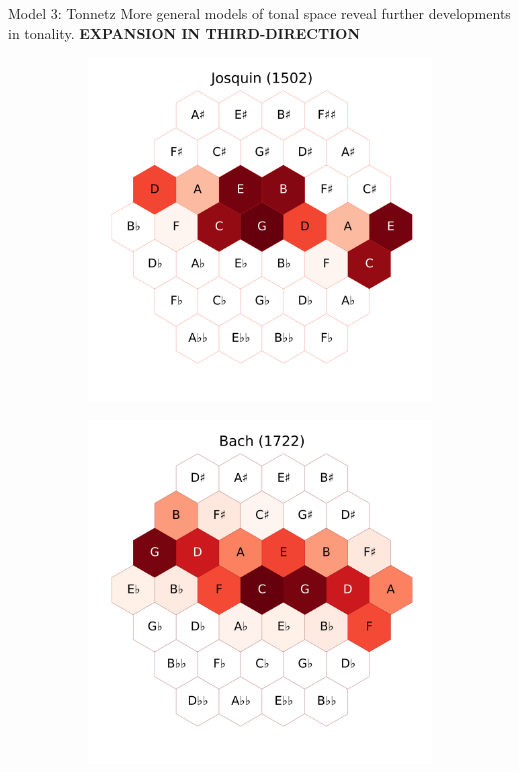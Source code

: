 \documentclass[final]{beamer}
\begin{document}
\begin{frame}[t]
\begin{minipage}[t][.65\textheight][t]{\textwidth}
\begin{columns}[t]
\begin{column}{0.3\textwidth}
			\begin{block}{Model 3: Tonnetz}
        More general models of tonal space reveal further developments in tonality.
				\textbf{EXPANSION IN THIRD-DIRECTION}
				\begin{figure}
				\centering
				\begin{subfigure}{\textwidth} %
					\includegraphics[width=\textwidth]{img/josquin_tonnetz.png}
				\end{subfigure}
				\begin{subfigure}{\textwidth} %
					\includegraphics[width=\textwidth]{img/bach_tonnetz.png}

\end{subfigure}
\end{figure}
\end{block}
\end{column}
\end{columns}
\end{minipage}
\end{frame}
\end{document}
